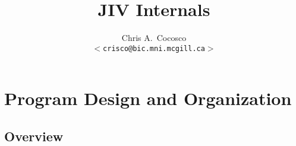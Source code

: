 \documentclass[11pt]{article}
\title{JIV Internals}
\author{Chris A.\ Cocosco \\
 \small{$<$\texttt{crisco@bic.mni.mcgill.ca}$>$} }
\begin{document}

\maketitle
\thispagestyle{empty}

\vfill
\newpage

\tableofcontents
\listoffigures
\newpage

\newcommand{\estimate}[2]{[~{\em estimated time required:} {#1}~hrs~{#2}]}


\section{Program Design and Organization}

\subsection{Overview}
\end{document}
